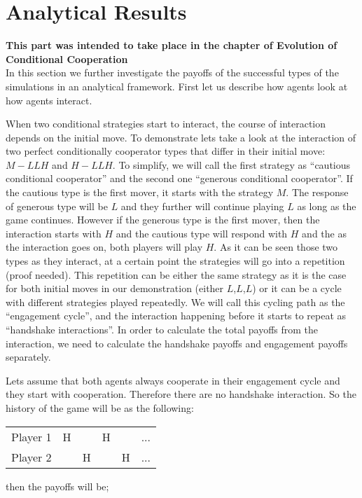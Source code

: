 
\section{Analytical Results}
\textbf{This part was intended to take place in the chapter of Evolution of Conditional Cooperation}\\
In this section we further investigate the payoffs of the successful types of the simulations in an analytical framework. First let us describe how agents look at how agents interact. 

When two conditional strategies start to interact, the course of interaction depends on the initial move. To demonstrate lets take a look at the interaction of two perfect conditionally cooperator types that differ in their initial move: $M-LLH$ and $H-LLH$. To simplify, we will call the first strategy as ``cautious conditional cooperator'' and the second one ``generous conditional cooperator''. If the cautious type is the first mover, it starts with the strategy $M$. The response of generous type will be $L$ and they further will continue playing $L$ as long as the game continues. However if the generous type is the first mover, then the interaction starts with $H$ and the cautious type will respond with $H$ and the as the interaction goes on, both players will play $H$. As it can be seen those two types as they interact, at a certain point the strategies will go into a repetition (proof needed). This repetition can be either the same strategy as it is the case for both initial moves in our demonstration (either $L$,$L$,$L$) or it can be a cycle with different strategies played repeatedly. We will call this cycling path as the ``engagement cycle'', and the interaction happening before it starts to repeat as ``handshake interactions''. In order to calculate the total payoffs from the interaction, we need to calculate the handshake payoffs and engagement payoffs separately. 

Lets assume that both agents always cooperate in their engagement cycle and they start with cooperation. Therefore there are no handshake interaction. So the history of the game will be as the following: 
\begin{table}[H]
\begin{center}

\begin{tabular}{lccccc}
Player 1 & H &   & H &   & ... \\
Player 2 &  & H &   & H  & ...\\
\end{tabular}

\end{center}
\end{table}
then the payoffs will be;

